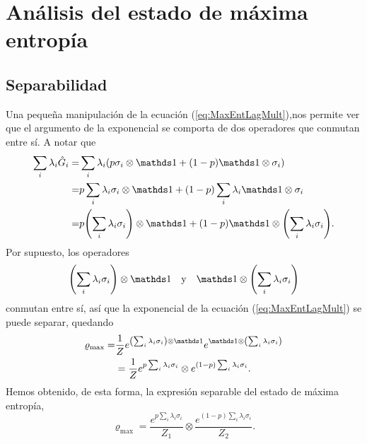 \section{Análisis del estado de máxima entropía}

\subsection{Separabilidad}
Una pequeña manipulación de la ecuación (\ref{eq:MaxEntLagMult}),nos permite ver que el argumento de la exponencial se comporta de dos operadores que conmutan entre sí. A notar que
\begin{align*}
    \sum_{i}\lambda_{i}\hat{G}_{i}=&\sum_{i}\lambda_{i}(p\pauli{i}\otimes\Id+(1-p)\Id\otimes\pauli{i})\\
    =&p\sum_{i}\lambda_{i}\pauli{i}\otimes\Id+(1-p)\sum_{i}\lambda_{i}\Id\otimes\pauli{i}\\
    =&p\qty(\sum_{i}\lambda_{i}\pauli{i})\otimes\Id+(1-p)\Id\otimes\qty(\sum_{i}\lambda_{i}\pauli{i}).
\end{align*}
Por supuesto, los operadores 
\begin{align*}
    \qty(\sum_{i}\lambda_{i}\pauli{i})\otimes\Id && \text{y} && \Id\otimes\qty(\sum_{i}\lambda_{i}\pauli{i})
\end{align*} 
conmutan entre sí, así que la exponencial de la ecuación (\ref{eq:MaxEntLagMult}) se puede separar, quedando
\begin{align*}
    \varrho_{\max}=&\frac{1}{Z}e^{\qty(\sum_{i}\lambda_{i}\pauli{i})\otimes\Id }e^{\Id\otimes\qty(\sum_{i}\lambda_{i}\pauli{i})}\\
    &=\frac{1}{Z}e^{p\sum_{i}\lambda_{i}\pauli{i}}\otimes e^{(1-p)\sum_{i}\lambda_{i}\pauli{i}}.
\end{align*}
Hemos obtenido, de esta forma, la expresión separable del estado de máxima entropía,
\begin{equation}\label{eq:MaxEntSeparable}
    \varrho_{\max}=\frac{e^{p\sum_{i}\lambda_{i}\sigma_{i}}}{Z_{1}} \otimes \frac{e^{(1-p)\sum_{i}\lambda_{i}\sigma_{i}}}{Z_{2}}.
\end{equation}

